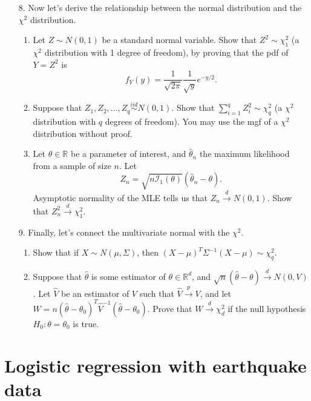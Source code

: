 \documentclass[11pt]{article}
\begin{document}
\begin{enumerate}

\item[8.] Now let's derive the relationship between the normal distribution and the $\chi^2$ distribution. 

\begin{enumerate}
\item Let $Z \sim N(0, 1)$ be a standard normal variable. Show that $Z^2 \sim \chi^2_1$ (a $\chi^2$ distribution with 1 degree of freedom), by proving that the pdf of $Y = Z^2$ is 
$$f_{Y}(y) = \frac{1}{\sqrt{2 \pi}} \frac{1}{\sqrt{y}} e^{-y/2}.$$

\item Suppose that $Z_1, Z_2,...,Z_q \overset{iid}{\sim} N(0, 1)$. Show that $\sum \limits_{i=1}^q Z_i^2 \sim \chi^2_q$ (a $\chi^2$ distribution with $q$ degrees of freedom). You may use the mgf of a $\chi^2$ distribution without proof.

\item Let $\theta \in \mathbb{R}$ be a parameter of interest, and $\widehat{\theta}_n$ the maximum likelihood from a sample of size $n$. Let 
$$Z_n = \sqrt{n \mathcal{I}_1(\theta)}(\widehat{\theta}_n - \theta).$$
Asymptotic normality of the MLE tells us that $Z_n \overset{d}{\to} N(0, 1)$. Show that $Z_n^2 \overset{d}{\to} \chi^2_1$.
\end{enumerate}


\item[9.] Finally, let's connect the multivariate normal with the $\chi^2$.

\begin{enumerate}


\item Show that if $X \sim N(\mu, \Sigma)$, then $(X - \mu)^T \Sigma^{-1} (X - \mu) \sim \chi^2_q$.

\item Suppose that $\widehat{\theta}$ is some estimator of $\theta \in \mathbb{R}^d$, and $\sqrt{n}(\widehat{\theta} - \theta) \overset{d}{\to} N(0, V)$. Let $\widehat{V}$ be an estimator of $V$ such that $\widehat{V} \overset{p}{\to} V$, and let $W = n(\widehat{\theta} - \theta_0)^T \widehat{V}^{-1} (\widehat{\theta} - \theta_0)$. Prove that $W \overset{d}{\to} \chi^2_d$ if the null hypothesis $H_0: \theta = \theta_0$ is true.
\end{enumerate}

\end{enumerate}

\section*{Logistic regression with earthquake data}
\end{document}
